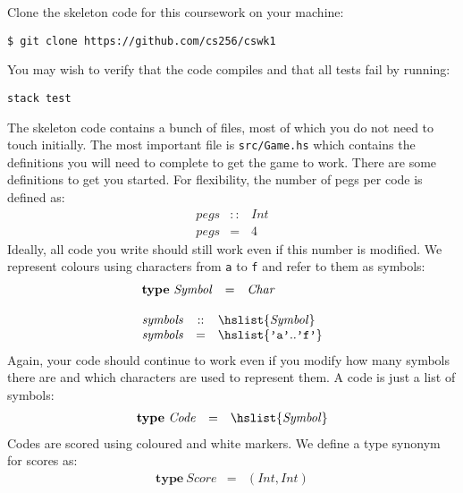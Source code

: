 \documentclass{cs256-shared/cs256}
\begin{document}
Clone the skeleton code for this coursework on your machine:
\begin{verbatim}
$ git clone https://github.com/cs256/cswk1
\end{verbatim}
You may wish to verify that the code compiles and that all tests fail by running:
\begin{verbatim}
stack test
\end{verbatim}
The skeleton code contains a bunch of files, most of which you do not need to touch initially. The most important file is \texttt{src/Game.hs} which contains the definitions you will need to complete to get the game to work. There are some definitions to get you started. For flexibility, the number of pegs per code is defined as:
\begin{displaymath}
\begin{array}{lcl}
\mathit{pegs} & :: & \mathit{Int} \\
\mathit{pegs} & = & 4
\end{array}
\end{displaymath}
Ideally, all code you write should still work even if this number is modified. We represent colours using characters from \texttt{a} to \texttt{f} and refer to them as symbols:
\begin{displaymath}
\begin{array}{l}
\begin{array}{lcl}
\mathbf{type}~\mathit{Symbol} & = & \mathit{Char}
\end{array} \\\\
\begin{array}{lcl}
\mathit{symbols} & :: & \hslist{\mathit{Symbol}} \\
\mathit{symbols} & = & \hslist{\texttt{'a'}..\texttt{'f'}}
\end{array}
\end{array}
\end{displaymath}
Again, your code should continue to work even if you modify how many symbols there are and which characters are used to represent them. A code is just a list of symbols:
\begin{displaymath}
\begin{array}{lcl}
\mathbf{type}~\mathit{Code} & = & \hslist{\mathit{Symbol}}
\end{array}
\end{displaymath}
Codes are scored using coloured and white markers. We define a type synonym for scores as:
\begin{displaymath}
\begin{array}{lcl}
\mathbf{type}~\mathit{Score} & = & (\mathit{Int}, \mathit{Int})
\end{array}
\end{displaymath}
\end{document}
